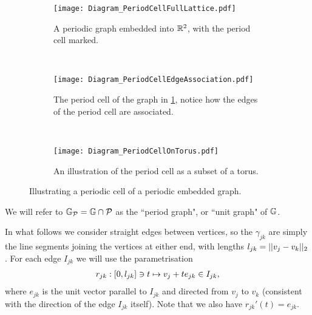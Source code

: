 \begin{figure}[b!]
	\centering
	\begin{subfigure}[t]{0.45\textwidth}
		\centering
		\texttt{[image: Diagram\_PeriodCellFullLattice.pdf]}
		\caption{\label{fig:Diagram_PeriodCellFullLattice} A periodic graph embedded into $\mathbb{R}^2$, with the period cell marked.}
	\end{subfigure}
	~
	\begin{subfigure}[t]{0.45\textwidth}
		\centering
		\texttt{[image: Diagram\_PeriodCellEdgeAssociation.pdf]}
		\caption{\label{fig:Diagram_PeriodCellEdgeAssociation} The period cell of the graph in \ref{fig:Diagram_PeriodCellFullLattice}, notice how the edges of the period cell are associated.}
	\end{subfigure}
	\\
	\begin{subfigure}[b]{0.75\textwidth}
		\centering
		\texttt{[image: Diagram\_PeriodCellOnTorus.pdf]}
		\caption{\label{fig:Diagram_PeriodCellOnTorus} An illustration of the period cell as a subset of a torus.}
	\end{subfigure}
	\caption{\label{fig:PeriodCellIllustration} Illustrating a periodic cell of a periodic embedded graph.}
\end{figure} 
We will refer to $\mathbb{G}_{\mathcal{P}} = \mathbb{G} \cap \mathcal{P}$ as the ``period graph", or ``unit graph" of $\mathbb{G}$. \newline

In what follows we consider straight edges between vertices, so the $\gamma_{jk}$ are simply the line segments joining the vertices at either end, with lengths $l_{jk} = \lvert\lvert v_j-v_k \rvert\rvert_2$. 
For each edge $I_{jk}$ we will use the parametrisation
\begin{align} \label{eq:EdgeParameterisation}
	r_{jk}:\left[ 0, l_{jk} \right] \ni t \mapsto v_j + te_{jk} \in I_{jk},
\end{align}
where $e_{jk}$ is the unit vector parallel to $I_{jk}$ and directed from $v_j$ to $v_k$ (consistent with the direction of the edge $I_{jk}$ itself).
Note that we also have $r_{jk}'(t) = e_{jk}$.


